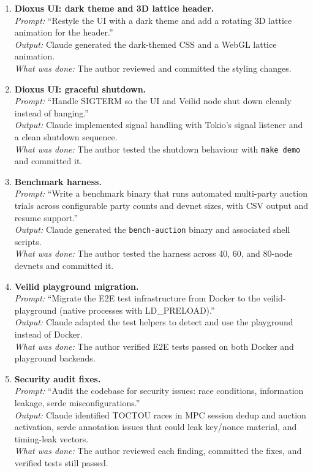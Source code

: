 \begin{enumerate}
  \item \textbf{Dioxus UI: dark theme and 3D lattice header.}\\
    \textit{Prompt:} ``Restyle the UI with a dark theme and add a
    rotating 3D lattice animation for the header.''\\
    \textit{Output:} Claude generated the dark-themed CSS and a WebGL
    lattice animation.\\
    \textit{What was done:} The author reviewed and committed the
    styling changes.

  \item \textbf{Dioxus UI: graceful shutdown.}\\
    \textit{Prompt:} ``Handle SIGTERM so the UI and Veilid node shut
    down cleanly instead of hanging.''\\
    \textit{Output:} Claude implemented signal handling with Tokio's
    signal listener and a clean shutdown sequence.\\
    \textit{What was done:} The author tested the shutdown behaviour
    with \texttt{make demo} and committed it.

  \item \textbf{Benchmark harness.}\\
    \textit{Prompt:} ``Write a benchmark binary that runs automated
    multi-party auction trials across configurable party counts and
    devnet sizes, with CSV output and resume support.''\\
    \textit{Output:} Claude generated the \texttt{bench-auction} binary
    and associated shell scripts.\\
    \textit{What was done:} The author tested the harness across 40, 60,
    and 80-node devnets and committed it.

  \item \textbf{Veilid playground migration.}\\
    \textit{Prompt:} ``Migrate the E2E test infrastructure from Docker
    to the veilid-playground (native processes with LD\_PRELOAD).''\\
    \textit{Output:} Claude adapted the test helpers to detect and use
    the playground instead of Docker.\\
    \textit{What was done:} The author verified E2E tests passed on
    both Docker and playground backends.

  \item \textbf{Security audit fixes.}\\
    \textit{Prompt:} ``Audit the codebase for security issues:
    race conditions, information leakage, serde misconfigurations.''\\
    \textit{Output:} Claude identified TOCTOU races in MPC session
    dedup and auction activation, serde annotation issues that could
    leak key/nonce material, and timing-leak vectors.\\
    \textit{What was done:} The author reviewed each finding, committed
    the fixes, and verified tests still passed.


\end{enumerate}
